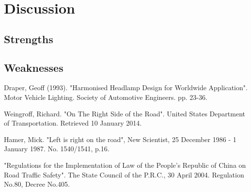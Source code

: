\section{Discussion}

\subsection{Strengths}
	
\subsection{Weaknesses}




\begin{thebibliography}{99}

 Draper, Geoff (1993). "Harmonised 
Headlamp Design for Worldwide Application". Motor Vehicle 
Lighting. Society of Automotive Engineers. pp. 23-36.

 Weingroff, Richard. "On The 
Right Side of the Road". United States Department of 
Transportation. Retrieved 10 January 2014.

 Hamer, Mick. "Left is right on the 
road", New Scientist, 25 December 1986 - 1 January 1987. No.
1540/1541, p.16.

 "Regulations for the Implementation of Law of the People's Republic of China on 
Road Traffic Safety". The State Council of the P.R.C., 30 
April 2004. Regulation No.80, Decree No.405.

\end{thebibliography}
